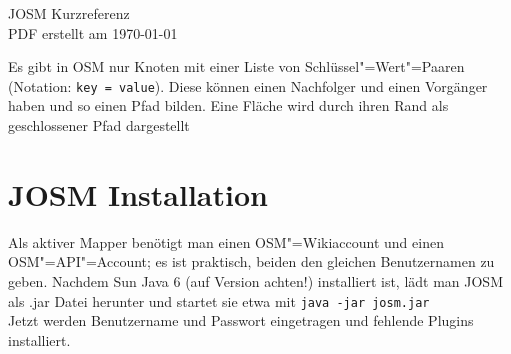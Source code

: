 \documentclass[a4paper,11pt,notumble]{leaflet}
\begin{document}
 

{\Huge JOSM Kurzreferenz}\\
{\small PDF erstellt am \today}

Es gibt in OSM nur Knoten mit einer Liste von Schlüssel"=Wert"=Paaren (Notation: \texttt{key\,=\,value}).
Diese können einen Nachfolger und einen Vorgänger haben und so einen Pfad bilden.
Eine Fläche wird durch ihren Rand als geschlossener Pfad dargestellt

\section*{JOSM Installation} 
Als aktiver Mapper benötigt man einen OSM"=Wikiaccount
und einen OSM"=API"=Account; es ist praktisch, beiden den gleichen Benutzernamen zu geben.
Nachdem Sun Java 6 (auf Version achten!) installiert ist, lädt man JOSM als .jar Datei herunter und startet sie
etwa mit \texttt{java -jar josm.jar}\\
Jetzt werden Benutzername und Passwort eingetragen und fehlende Plugins installiert.
\end{document}
